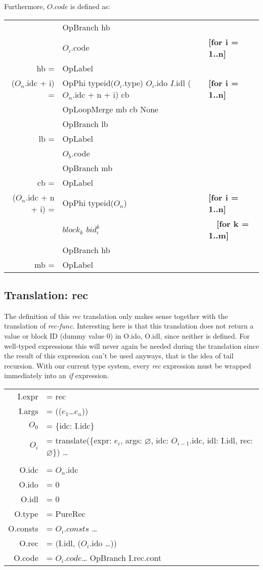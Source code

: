 \documentclass[letterpaper,12pt]{article}
\begin{document}
Furthermore, $O.code$ is defined as: \\
\begin{tabularx}{\linewidth}{rll}
	&OpBranch hb \\
	&$O_i$.code & \textbf{[for i = 1..n]} \\
	\cline{1-2}
	hb = &OpLabel \\
	($O_n$.idc + i) = &OpPhi\: typeid($O_i$.type) $O_i$.ido $I$.idl ($O_n$.idc + n + i) cb & \textbf{[for i = 1..n]} \\
	&OpLoopMerge mb cb None \\
	&OpBranch lb \\
	\cline{1-2}
	lb = &OpLabel \\
	&$O_b$.code \\
	&OpBranch mb \\
	\cline{1-2}
	cb = &OpLabel \\
	($O_n$.idc + n + i) = &OpPhi typeid($O_n$) & \textbf{[for i = 1..n]} \\
		&\quad $block_k$ $bid_i^k$ & $\quad$\textbf{[for k = 1..m]} \\
	&OpBranch hb \\
	\cline{1-2}
	mb = &OpLabel
\end{tabularx}


\subsection{Translation: rec}

The definition of this \textit{rec} translation only makes sense together
with the translation of \textit{rec-func}. Interesting here is that
this translation does not return a value or block ID (dummy value 0) in 
O.ido, O.idl, since neither is defined.
For well-typed expressions this will never again be needed during
the translation since the result of this expression can't be used
anyways, that is the idea of tail recursion.
With our current type system, every \textit{rec} expression must be wrapped
immediately into an \textit{if} expression.

\medskip
\begin{tabularx}{\linewidth}{rl}
	I.expr &= rec \\
	I.args &= (($e_1$\dots$e_n$)) \\
	$O_0$ &= \{idc: I.idc\} \\
	$O_i$ &= translate(\{expr: $e_i$, args: $\varnothing$, idc: $O_{i - 1}$.idc, idl: I.idl, rec: $\varnothing$\}) \dots \\
	\\
	O.idc &= $O_n$.idc \\
	O.ido &= 0 \\ 
	O.idl &= 0 \\
	O.type &= PureRec \\
	O.consts &= $O_i.consts$ \dots \\
	O.rec &= (I.idl, ($O_i$.ido \dots)) \\
	O.code &= $O_i.code$\dots \: OpBranch I.rec.cont \\
\end{tabularx}
\end{document}
